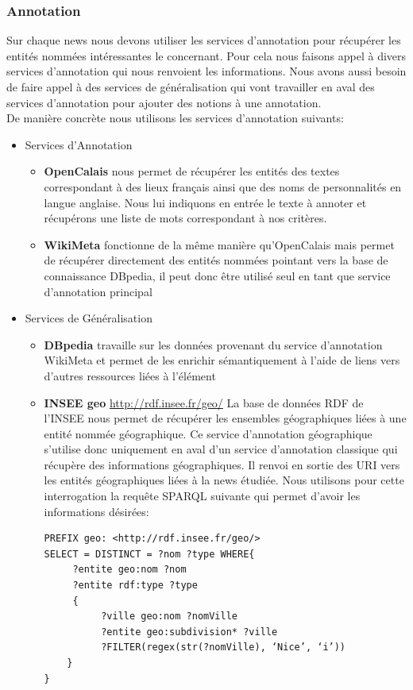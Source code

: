 \documentclass[]{easychair}
\begin{document}
\subsubsection{Annotation }
Sur chaque news nous devons utiliser les services d'annotation pour récupérer les entités nommées intéressantes le concernant. Pour cela nous faisons appel à divers services d'annotation qui nous renvoient les informations. Nous avons aussi besoin de faire appel à des services de généralisation qui vont travailler en aval des services d'annotation pour ajouter des notions à une annotation.\\
De manière concrète nous utilisons les services d'annotation suivants:
\begin{itemize}

\item Services d'Annotation
\begin{itemize}
\item \textbf{OpenCalais} nous permet de récupérer les entités des textes correspondant à des lieux français ainsi que des noms de personnalités en langue anglaise. Nous lui indiquons en entrée le texte à annoter et récupérons une liste de mots correspondant à nos critères.
\item \textbf{WikiMeta} fonctionne de la même manière qu'OpenCalais mais permet de récupérer directement des entités nommées pointant vers la base de connaissance DBpedia, il peut donc être utilisé seul en tant que service d'annotation principal
\end{itemize}

\item Services de Généralisation
\begin{itemize}
\item \textbf{DBpedia} travaille sur les données provenant du service d'annotation WikiMeta et permet de les enrichir sémantiquement à l'aide de liens vers d'autres ressources liées à l'élément
\item \textbf{INSEE geo} \url{http://rdf.insee.fr/geo/} La base de données RDF de l'INSEE nous permet de récupérer les ensembles géographiques liées à une entité nommée géographique. Ce service d'annotation géographique s'utilise donc uniquement en aval d'un service d'annotation classique qui récupère des informations géographiques. Il renvoi en sortie des URI vers les entités géographiques liées à la news étudiée. Nous utilisons pour cette interrogation la requête SPARQL suivante qui permet d'avoir les informations désirées:

\begin{verbatim}
PREFIX geo: <http://rdf.insee.fr/geo/>
SELECT = DISTINCT = ?nom ?type WHERE{
	 ?entite geo:nom ?nom
	 ?entite rdf:type ?type
	 { 
		  ?ville geo:nom ?nomVille
		  ?entite geo:subdivision* ?ville
		  ?FILTER(regex(str(?nomVille), ‘Nice’, ‘i’))
	}
}
\end{verbatim}
\end{itemize}

\end{itemize}
\end{document}

